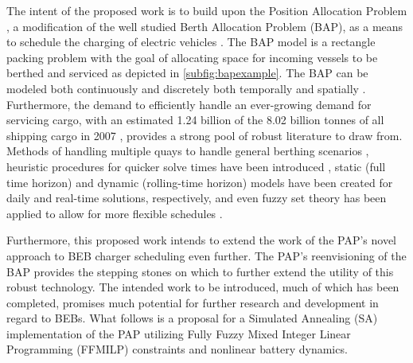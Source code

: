 \documentclass[11pt,a4paper,final]{article}
\begin{document}
The intent of the proposed work is to build upon the Position Allocation Problem \cite{qarebagh-2019-optim-sched}, a
modification of the well studied Berth Allocation Problem (BAP), as a means to schedule the charging of electric
vehicles \cite{buhrkal-2011-model-discr,frojan-2015-contin-berth,imai-2001-dynam-berth}. The BAP model is a rectangle
packing problem with the goal of allocating space for incoming vessels to be berthed and serviced as depicted in
\autoref{subfig:bapexample}. The BAP can be modeled both continuously and discretely both temporally and spatially
\cite{buhrkal-2011-model-discr,frojan-2015-contin-berth}. Furthermore, the demand to efficiently handle an
ever-growing demand for servicing cargo, with an estimated 1.24 billion of the 8.02 billion tonnes of all shipping cargo
in 2007 \cite{buhrkal-2011-model-discr}, provides a strong pool of robust literature to draw from. Methods of handling
multiple quays to handle general berthing scenarios \cite{frojan-2015-contin-berth,dai-2008-suppl-chain-analy},
heuristic procedures for quicker solve times have been introduced \cite{imai-2001-dynam-berth}, static (full time
horizon) and dynamic (rolling-time horizon) models have been created for daily and real-time solutions, respectively,
and even fuzzy set theory has been applied to allow for more flexible schedules \cite{bello-2019-fuzzy-activ}.

Furthermore, this proposed work intends to extend the work of the PAP's novel approach to BEB charger scheduling even
further. The PAP's reenvisioning of the BAP provides the stepping stones on which to further extend the utility of this
robust technology. The intended work to be introduced, much of which has been completed, promises much potential for
further research and development in regard to BEBs. What follows is a proposal for a Simulated Annealing (SA)
implementation of the PAP utilizing Fully Fuzzy Mixed Integer Linear Programming (FFMILP) constraints and nonlinear
battery dynamics.
\end{document}
